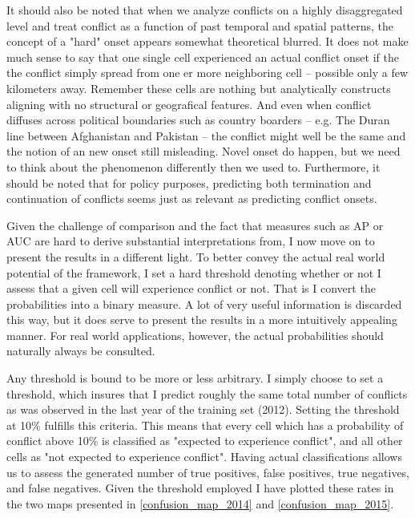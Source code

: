 \documentclass[a4paper]{article}
\begin{document}
It should also be noted that when we analyze conflicts on a highly disaggregated level and treat conflict as a function of past temporal and spatial patterns, the concept of a "hard" onset appears somewhat theoretical blurred. It does not make much sense to say that one single cell experienced an actual conflict onset if the the conflict simply spread from one er more neighboring cell -- possible only a few kilometers away. Remember these cells are nothing but analytically constructs aligning with no structural or geografical features. And even when conflict diffuses across political boundaries such as country boarders  -- e.g. The Duran line between Afghanistan and Pakistan --  the conflict might well be the same and the notion of an new onset still misleading. Novel onset do happen, but we need to think about the phenomenon differently then we used to. Furthermore, it should be noted that for policy purposes, predicting both termination and continuation of conflicts seems just as relevant as predicting conflict onsets.\par  


Given the challenge of comparison and the fact that measures such as AP or AUC are hard to derive substantial interpretations from, I now move on to present the results in a different light. To better convey the actual real world potential of the framework, I set a hard threshold denoting whether or not I assess that a given cell will experience conflict or not. That is I convert the probabilities into a binary measure. A lot of very useful information is discarded this way, but it does serve to present the results in a more intuitively appealing manner. For real world applications, however, the actual probabilities should naturally always be consulted.\par

Any threshold is bound to be more or less arbitrary. I simply choose to set a threshold, which insures that I predict roughly the same total number of conflicts as was observed in the last year of the training set (2012). Setting the threshold at 10\% fulfills this criteria. This means that every cell which has a probability of conflict above 10\% is classified as "expected to experience conflict", and all other cells as "not expected to experience conflict". Having actual classifications allows us to assess the generated number of true positives, false positives, true negatives, and false negatives. Given the threshold employed I have plotted these rates in the two maps presented in \autoref{confusion_map_2014} and \autoref{confusion_map_2015}.\par
\end{document}
